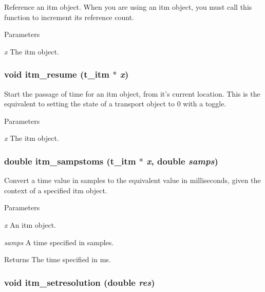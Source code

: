 Reference an itm object. When you are using an itm object, you must call this function to increment its reference count.


\begin{DoxyParams}{Parameters}
\item[{\em x}]The itm object. \end{DoxyParams}
\hypertarget{group__time_ga1f3b1dded32c2fcbd955adb094c81d98}{
\subsubsection[{itm\_\-resume}]{\setlength{\rightskip}{0pt plus 5cm}void itm\_\-resume ({\bf t\_\-itm} $\ast$ {\em x})}}
\label{group__time_ga1f3b1dded32c2fcbd955adb094c81d98}


Start the passage of time for an itm object, from it's current location. This is the equivalent to setting the state of a transport object to 0 with a toggle.


\begin{DoxyParams}{Parameters}
\item[{\em x}]The itm object. \end{DoxyParams}
\hypertarget{group__time_ga554348a51466458ca16a7c8101e16f44}{
\subsubsection[{itm\_\-sampstoms}]{\setlength{\rightskip}{0pt plus 5cm}double itm\_\-sampstoms ({\bf t\_\-itm} $\ast$ {\em x}, \/  double {\em samps})}}
\label{group__time_ga554348a51466458ca16a7c8101e16f44}


Convert a time value in samples to the equivalent value in milliseconds, given the context of a specified itm object. 
\begin{DoxyParams}{Parameters}
\item[{\em x}]An itm object. \item[{\em samps}]A time specified in samples. \end{DoxyParams}
\begin{DoxyReturn}{Returns}
The time specified in ms. 
\end{DoxyReturn}
\hypertarget{group__time_gac777d53869fe6e01bdce0c34f868f648}{
\subsubsection[{itm\_\-setresolution}]{\setlength{\rightskip}{0pt plus 5cm}void itm\_\-setresolution (double {\em res})}}
\label{group__time_gac777d53869fe6e01bdce0c34f868f648}


